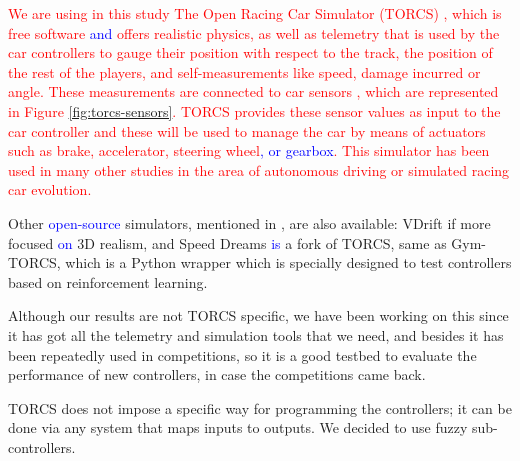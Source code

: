 \documentclass[10pt,journal,compsoc]{IEEEtran}
\begin{document}
\textcolor{red}{
We are using in this study The Open Racing Car Simulator (TORCS) \cite{torcs4}, which is free software \textcolor{blue}{and} offers realistic physics, as well as telemetry that is used by the car controllers to gauge their position with respect to the track, the position of the rest of the players, and self-measurements like speed, damage incurred or angle. These measurements are connected to car sensors \cite{torcs5}, which are represented in Figure \ref{fig:torcs-sensors}. TORCS provides these sensor values as input to the car controller and these will be
used to manage the car by means of actuators such as brake, accelerator, steering wheel\textcolor{blue}{, or gearbox}. 
This simulator has been used in many other studies in the area of autonomous driving or simulated racing car evolution.}


Other \textcolor{blue}{open-source} simulators, mentioned in \cite{Loiacono:2012:LEA:2212908.2212953}, are also available: VDrift
if more focused \textcolor{blue}{on} 3D realism, and Speed Dreams \textcolor{blue}{is}  a fork of
TORCS, same as Gym-TORCS, which is a Python wrapper which is specially designed to test controllers based on reinforcement learning.

Although our results are not TORCS specific, we have been
working on this since it has got all the telemetry and simulation
tools that we need, and besides it has been repeatedly used in
competitions, so it is a good testbed to evaluate the performance of new controllers, in case the competitions came back.

TORCS does not impose a specific way for programming the controllers;
it can be done via any system that maps inputs to outputs. We decided
to use fuzzy sub-controllers.
\end{document}
